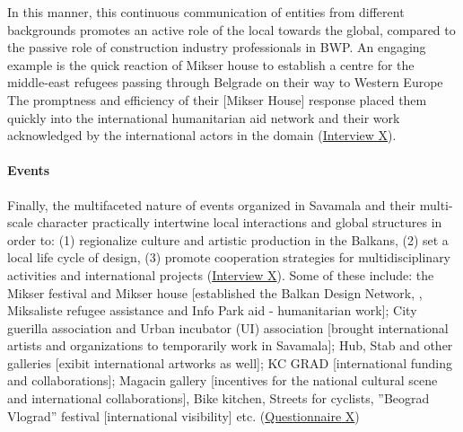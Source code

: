 \documentclass[11pt]{report}
\begin{document}
{{{{In this manner, this continuous communication of entities from different backgrounds promotes an active role of the local towards the global, compared to the passive role of construction industry professionals in BWP. An engaging example is the quick reaction of Mikser house to establish a centre for the middle-east refugees passing through Belgrade on their way to Western Europe
The promptness and efficiency of their [Mikser House] response placed them quickly into the international humanitarian aid network and their work acknowledged by the international actors in the domain (\href{InterviewX}{Interview X}).

\paragraph{Events}

Finally, the multifaceted nature of events organized in Savamala and their multi-scale character practically intertwine local interactions and global structures in order to:
(1) regionalize culture and artistic production in the Balkans,
(2) set a local life cycle of design,
(3) promote cooperation strategies for multidisciplinary activities and international projects (\href{InterviewX}{Interview X}).
Some of these include: the Mikser festival and Mikser house [established the Balkan Design Network,  , Miksaliste refugee assistance and Info Park aid - humanitarian work]; City guerilla association and Urban incubator (UI) association [brought international artists and organizations to temporarily work in Savamala]; Hub, Stab and other galleries [exibit international artworks as well]; KC GRAD [international funding and collaborations]; Magacin gallery [incentives for the national cultural scene and international collaborations], Bike kitchen, Streets for cyclists, ”Beograd Vlograd” festival [international visibility] etc.
(\href{Questionnaire Students Savamala}{Questionnaire X})
\\

}}}}
\end{document}

